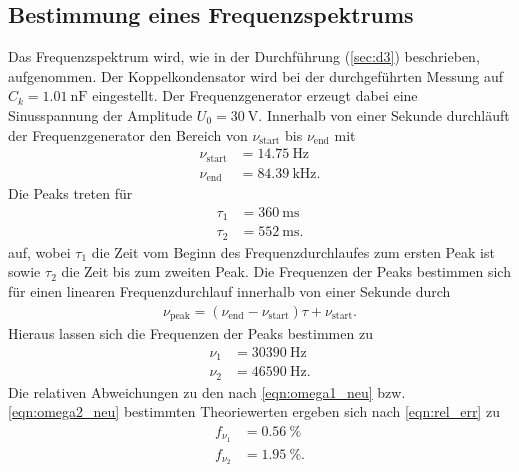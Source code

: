 \subsection{Bestimmung eines Frequenzspektrums}
Das Frequenzspektrum wird, wie in der Durchführung (\ref{sec:d3}) beschrieben, aufgenommen.
Der Koppelkondensator wird bei der durchgeführten Messung auf $C_k = \SI{1.01}{\nano\farad}$ eingestellt.
Der Frequenzgenerator erzeugt dabei eine Sinusspannung der Amplitude $U_0 = \SI{30}{\volt}$.
Innerhalb von einer Sekunde durchläuft der Frequenzgenerator den Bereich von $\nu_{\text{start}}$ bis $\nu_{\text{end}}$ mit
\begin{align*}
  \nu_{\text{start}} &= \SI{14.75}{\hertz} \\
  \nu_{\text{end}} &= \SI{84.39}{\kilo\hertz}.
\end{align*}
Die Peaks treten für
\begin{align*}
  \tau_1 &= \SI{360}{\milli\second} \\
  \tau_2 &= \SI{552}{\milli\second}.
\end{align*}
auf, wobei $\tau_1$ die Zeit vom Beginn des Frequenzdurchlaufes zum ersten Peak ist sowie $\tau_2$ die Zeit bis zum zweiten Peak.
Die Frequenzen der Peaks bestimmen sich für einen linearen Frequenzdurchlauf innerhalb von einer Sekunde durch
\begin{align}
  \nu_{\text{peak}} = (\nu_{\text{end}} - \nu_{\text{start}}) \tau + \nu_{\text{start}}.
\end{align}
Hieraus lassen sich die Frequenzen der Peaks bestimmen zu
\begin{align*}
  \nu_1 &= \SI{30390}{\hertz} \\
  \nu_2 &= \SI{46590}{\hertz}.
\end{align*}
Die relativen Abweichungen zu den nach \eqref{eqn:omega1_neu} bzw. \eqref{eqn:omega2_neu} bestimmten Theoriewerten ergeben sich nach \eqref{eqn:rel_err} zu
\begin{align*}
  f_{\nu_1} &= \SI{0.56}{\percent} \\
  f_{\nu_2} &= \SI{1.95}{\percent}.
\end{align*}
%
%
%
%
